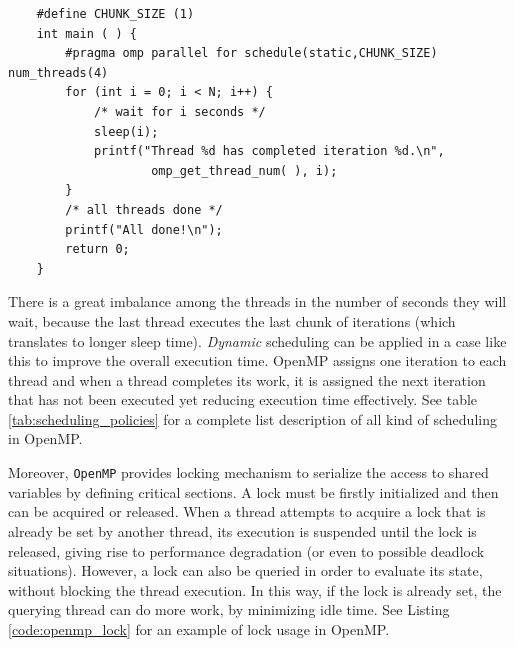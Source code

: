 \begin{description}
    \begin{lstlisting}
    #define CHUNK_SIZE (1)
    int main ( ) {
    	#pragma omp parallel for schedule(static,CHUNK_SIZE) num_threads(4)
    	for (int i = 0; i < N; i++) {
    		/* wait for i seconds */
    		sleep(i);    		
    		printf("Thread %d has completed iteration %d.\n", 
    				omp_get_thread_num( ), i);
    	}
    	/* all threads done */
    	printf("All done!\n");
    	return 0;
    }
\end{lstlisting}
There is a great imbalance among the threads in the number of seconds they will wait, because the last thread executes the last chunk of iterations (which translates to longer sleep time).
\textit{Dynamic} scheduling can be applied in a case like this to improve the overall execution time. OpenMP assigns one iteration to each thread and when a thread completes its work, it is assigned the next iteration that has not been executed yet reducing execution time effectively. See table \ref{tab:scheduling_policies} for a complete list description of all kind of scheduling in OpenMP.

Moreover, \texttt{OpenMP} provides locking mechanism to serialize the access to shared variables by defining critical sections.
A lock must be firstly  initialized and then can be acquired or released. When a thread  attempts to acquire a lock that is already be set by another
thread, its execution is suspended until the lock is released,
giving rise to performance degradation (or even to possible deadlock
situations). 
However, a lock can also be queried in order to
evaluate its state, without blocking the thread execution. In this
way, if the lock is already set, the querying thread can do
more work, by minimizing idle time. See Listing \ref{code:openmp_lock} for an example of lock usage in OpenMP.


\end{description}
